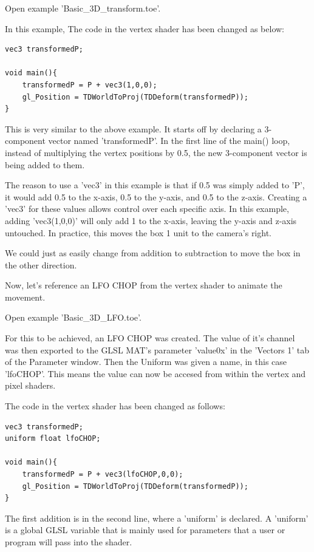 \begin{fullwidth}
Open example 'Basic\_3D\_transform.toe'.

In this example, The code in the vertex shader has been changed as below:

\begin{lstlisting}
vec3 transformedP;

void main(){
	transformedP = P + vec3(1,0,0);
	gl_Position = TDWorldToProj(TDDeform(transformedP));
}
\end{lstlisting}

This is very similar to the above example. It starts off by declaring a 3-component vector named 'transformedP'. In the first line of the main() loop, instead of multiplying the vertex positions by 0.5, the new 3-component vector is being added to them.

The reason to use a 'vec3' in this example is that if 0.5 was simply added to 'P', it would add 0.5 to the x-axis, 0.5 to the y-axis, and 0.5 to the z-axis. Creating a 'vec3' for these values allows control over each specific axis. In this example, adding 'vec3(1,0,0)' will only add 1 to the x-axis, leaving the y-axis and z-axis untouched. In practice, this moves the box 1 unit to the camera's right.

We could just as easily change from addition to subtraction to move the box in the other direction.

Now, let's reference an LFO CHOP from the vertex shader to animate the movement.

Open example 'Basic\_3D\_LFO.toe'.

For this to be achieved, an LFO CHOP was created. The value of it's channel was then exported to the GLSL MAT's parameter 'value0x' in the 'Vectors 1' tab of the Parameter window. Then the Uniform was given a name, in this case 'lfoCHOP'. This means the value can now be accesed from within the vertex and pixel shaders.

The code in the vertex shader has been changed as follows:

\begin{lstlisting}
vec3 transformedP;
uniform float lfoCHOP;

void main(){
	transformedP = P + vec3(lfoCHOP,0,0);
	gl_Position = TDWorldToProj(TDDeform(transformedP));
}
\end{lstlisting}

The first addition is in the second line, where a 'uniform' is declared. A 'uniform' is a global GLSL variable that is mainly used for parameters that a user or program will pass into the shader.


\end{fullwidth}

